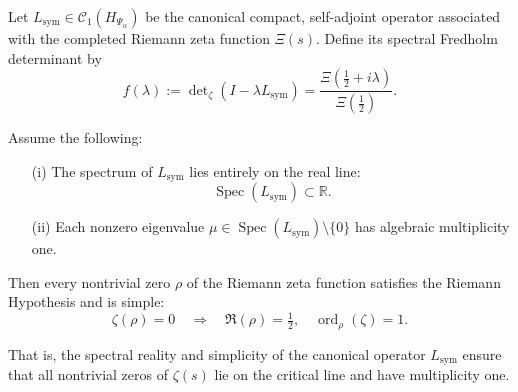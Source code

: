 \begin{proposition}
\label{prop:spectrum-reality-implies-rh-multiplicity}
Let \( L_{\mathrm{sym}} \in \mathcal{C}_1(H_{\Psi_\alpha}) \) be the canonical compact, self-adjoint operator associated with the completed Riemann zeta function \( \Xi(s) \). Define its spectral Fredholm determinant by
\[
f(\lambda) := \det\nolimits_\zeta(I - \lambda L_{\mathrm{sym}}) = \frac{\Xi\left( \tfrac{1}{2} + i\lambda \right)}{\Xi\left( \tfrac{1}{2} \right)}.
\]

Assume the following:
\begin{enumerate}
  \item[\textnormal{(i)}] The spectrum of \( L_{\mathrm{sym}} \) lies entirely on the real line:
  \[
  \operatorname{Spec}(L_{\mathrm{sym}}) \subset \mathbb{R}.
  \]
  \item[\textnormal{(ii)}] Each nonzero eigenvalue \( \mu \in \operatorname{Spec}(L_{\mathrm{sym}}) \setminus \{0\} \) has algebraic multiplicity one.
\end{enumerate}

Then every nontrivial zero \( \rho \) of the Riemann zeta function satisfies the Riemann Hypothesis and is simple:
\[
\zeta(\rho) = 0 \quad \Longrightarrow \quad \Re(\rho) = \tfrac{1}{2}, \quad \operatorname{ord}_\rho(\zeta) = 1.
\]

\medskip
\noindent
That is, the spectral reality and simplicity of the canonical operator \( L_{\mathrm{sym}} \) ensure that all nontrivial zeros of \( \zeta(s) \) lie on the critical line and have multiplicity one.
\end{proposition}
